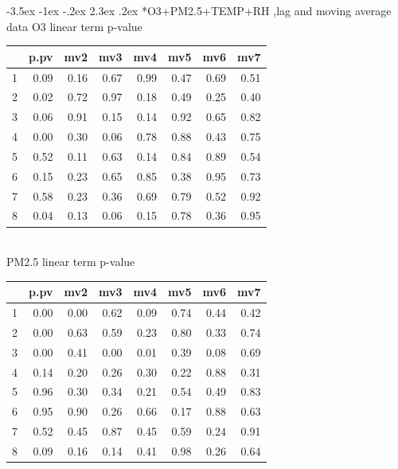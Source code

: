 \documentclass[a4paper, 12pt]{article}
\makeatletter
\def\Large{\fontsize{16}{24}\selectfont}
\renewcommand\section{\@startsection {section}{1}{\z@}%
                                   {-3.5ex \@plus -1ex \@minus -.2ex}%
                                   {2.3ex \@plus.2ex}%
                                   {\centering\normalfont\Large\bfseries}}
\makeatother
\begin{document}
\section*{O3+PM2.5+TEMP+RH ,lag and moving average data}
O3 linear term p-value\\
\begin{table}[ht]
\centering
\begin{tabular}{rrrrrrrr}
  \hline
 & p.pv & mv2 & mv3 & mv4 & mv5 & mv6 & mv7 \\
  \hline
1 & 0.09 & 0.16 & 0.67 & 0.99 & 0.47 & 0.69 & 0.51 \\
  2 & 0.02 & 0.72 & 0.97 & 0.18 & 0.49 & 0.25 & 0.40 \\
  3 & 0.06 & 0.91 & 0.15 & 0.14 & 0.92 & 0.65 & 0.82 \\
  4 & 0.00 & 0.30 & 0.06 & 0.78 & 0.88 & 0.43 & 0.75 \\
  5 & 0.52 & 0.11 & 0.63 & 0.14 & 0.84 & 0.89 & 0.54 \\
  6 & 0.15 & 0.23 & 0.65 & 0.85 & 0.38 & 0.95 & 0.73 \\
  7 & 0.58 & 0.23 & 0.36 & 0.69 & 0.79 & 0.52 & 0.92 \\
  8 & 0.04 & 0.13 & 0.06 & 0.15 & 0.78 & 0.36 & 0.95 \\
   \hline
\end{tabular}
\end{table}
\\
PM2.5 linear term p-value\\
\begin{table}[ht]
\centering
\begin{tabular}{rrrrrrrr}
  \hline
 & p.pv & mv2 & mv3 & mv4 & mv5 & mv6 & mv7 \\
  \hline
1 & 0.00 & 0.00 & 0.62 & 0.09 & 0.74 & 0.44 & 0.42 \\
  2 & 0.00 & 0.63 & 0.59 & 0.23 & 0.80 & 0.33 & 0.74 \\
  3 & 0.00 & 0.41 & 0.00 & 0.01 & 0.39 & 0.08 & 0.69 \\
  4 & 0.14 & 0.20 & 0.26 & 0.30 & 0.22 & 0.88 & 0.31 \\
  5 & 0.96 & 0.30 & 0.34 & 0.21 & 0.54 & 0.49 & 0.83 \\
  6 & 0.95 & 0.90 & 0.26 & 0.66 & 0.17 & 0.88 & 0.63 \\
  7 & 0.52 & 0.45 & 0.87 & 0.45 & 0.59 & 0.24 & 0.91 \\
  8 & 0.09 & 0.16 & 0.14 & 0.41 & 0.98 & 0.26 & 0.64 \\
   \hline
\end{tabular}
\end{table}
\end{document}
